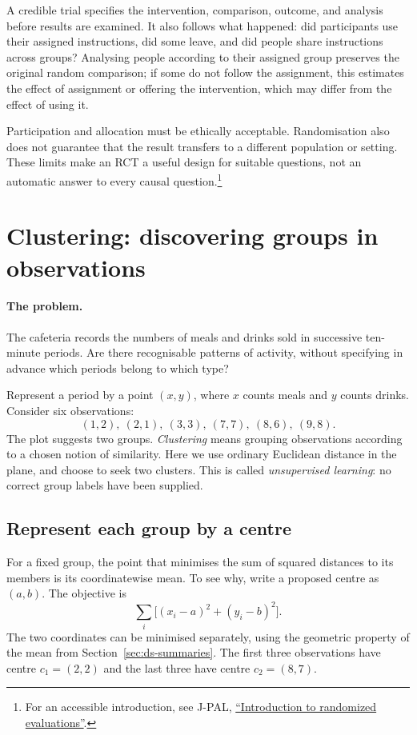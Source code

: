 A credible trial specifies the intervention, comparison, outcome, and
analysis before results are examined. It also follows what happened:
did participants use their assigned instructions, did some leave, and
did people share instructions across groups? Analysing people according
to their assigned group preserves the original random comparison; if
some do not follow the assignment, this estimates the effect of assignment
or offering the intervention, which may differ from the effect of using it.

Participation and allocation must be ethically acceptable. Randomisation
also does not guarantee that the result transfers to a different population
or setting. These limits make an RCT a useful design for suitable questions,
not an automatic answer to every causal question.\footnote{For an accessible
introduction, see J-PAL,
\href{https://www.povertyactionlab.org/resource/introduction-randomized-evaluations}
{``Introduction to randomized evaluations''}.}

\section{Clustering: discovering groups in observations}
\label{sec:ds-clustering}
\paragraph{The problem.}
The cafeteria records the numbers of meals and drinks sold in successive
ten-minute periods. Are there recognisable patterns of activity, without
specifying in advance which periods belong to which type?

Represent a period by a point $(x,y)$, where $x$ counts meals and $y$
counts drinks. Consider six observations:
\[
 (1,2),\ (2,1),\ (3,3),\ (7,7),\ (8,6),\ (9,8).
\]
The plot suggests two groups. \emph{Clustering} means grouping observations
according to a chosen notion of similarity. Here we use ordinary Euclidean
distance in the plane, and choose to seek two clusters. This is called
\emph{unsupervised learning}: no correct group labels have been supplied.

\subsection{Represent each group by a centre}
For a fixed group, the point that minimises the sum of squared distances
to its members is its coordinatewise mean. To see why, write a proposed
centre as $(a,b)$. The objective is
\[
 \sum_i\bigl[(x_i-a)^2+(y_i-b)^2\bigr].
\]
The two coordinates can be minimised separately, using the geometric
property of the mean from Section~\ref{sec:ds-summaries}. The first three
observations have centre $c_1=(2,2)$ and the last three have centre
$c_2=(8,7)$.


